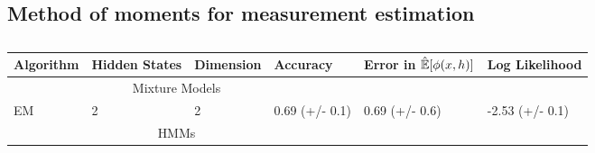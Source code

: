 

\subsection{Method of moments for measurement estimation}

\begin{table}
    \label{tab:errors}
    \begin{tabular}{l | l l | l l l }
        Algorithm & Hidden States & Dimension & Accuracy & Error in $\hat {\mathbb{E}}[\phi(x,h)]$ & Log Likelihood \\ \hline
        & \multicolumn{2}{|c|}{Mixture Models} & & & \\ \hline
        EM & 2 & 2 & 0.69 (+/- 0.1) & 0.69 (+/- 0.6) & -2.53 (+/- 0.1) \\
        & \multicolumn{2}{|c|}{HMMs} & & & \\ \hline
% 
% 
    \end{tabular}
    \caption{}
\end{table}

